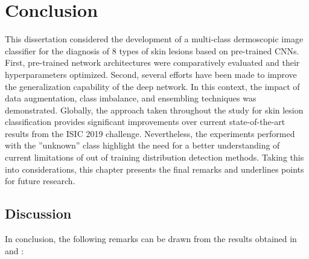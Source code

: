 \chapter{Conclusion}
\label{chapter:conclusion}

This dissertation considered the development of a multi-class dermoscopic image classifier for the diagnosis of 8 types of skin lesions based on pre-trained CNNs. First, pre-trained network architectures were comparatively evaluated and their hyperparameters optimized. Second, several efforts have been made to improve the generalization capability of the deep network. In this context, the impact of data augmentation, class imbalance, and ensembling techniques was demonstrated. Globally, the approach taken throughout the study for skin lesion classification provides significant improvements over current state-of-the-art results from the \ac{ISIC} 2019 challenge. Nevertheless, the experiments performed with the ”unknown” class highlight the need for a better understanding of current limitations of out of training distribution detection methods. Taking this into considerations, this chapter presents the final remarks and underlines points for future research.

\section{Discussion}
    In conclusion, the following remarks can be drawn from the results obtained in  and :
    
